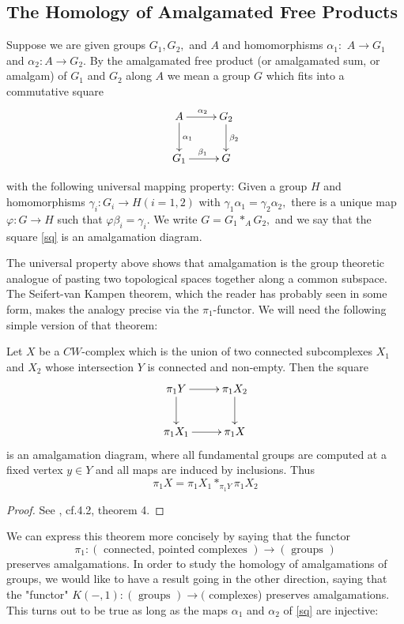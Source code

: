 \newpage
\subsection{The Homology of Amalgamated Free Products}
\begin{definition}
Suppose we are given groups $G_{1}, G_{2},$ and $A$ and homomorphisms $\alpha_{1}:$ $A \rightarrow G_{1}$ and $\alpha_{2}: A \rightarrow G_{2} .$ By the amalgamated free product (or amalgamated sum, or amalgam) of $G_{1}$ and $G_{2}$ along $A$ we mean a group $G$ which fits into a commutative square
\begin{equation}
\label{sq}
\xymatrix{
A \ar[d]^{\alpha_1} \ar[r]^{\alpha_2} &G_2 \ar[d]^{\beta_2}\\
G_1\ar[r]^{\beta_1} & G}
\end{equation}
\par
with the following universal mapping property: Given a group $H$ and homomorphisms $\gamma_{i}: G_{i} \rightarrow H(i=1,2)$ with $\gamma_{1} \alpha_{1}=\gamma_{2} \alpha_{2},$ there is a unique map
$\varphi: G \rightarrow H$ such that $\varphi \beta_{i}=\gamma_{i} .$ We write $G=G_{1} *_{A} G_{2},$ and we say that the square \eqref{sq} is an amalgamation diagram.
\end{definition}

The universal property above shows that amalgamation is the group theoretic analogue of pasting two topological spaces together along a common subspace. The Seifert-van Kampen theorem, which the reader has probably seen in some form, makes the analogy precise via the $\pi_{1}$-functor. We will need the following simple version of that theorem:
\begin{theorem}
\label{thm_van}
Let $X$ be a $C W$-complex which is the union of two connected subcomplexes $X_{1}$ and $X_{2}$ whose intersection $Y$ is connected and non-empty.
Then the square
$$
\xymatrix{
\pi_1 Y \ar[d] \ar[r] &\pi_1 X_2\ar[d]\\
\pi_1 X_1\ar[r] & \pi_1 X}
$$
is an amalgamation diagram, where all fundamental groups are computed at a fixed vertex $y \in Y$ and all maps are induced by inclusions. Thus
\[
\pi_{1} X=\pi_{1} X_{1} *_{\pi_{1}Y} \pi_{1} X_{2}
\]
\end{theorem}
\begin{proof}
See \cite{cohen1989combinatorial}, cf.4.2, theorem 4.
\end{proof}
We can express this theorem more concisely by saying that the functor
$$\pi_{1}:(\text { connected, pointed complexes }) \rightarrow(\text { groups })$$
preserves amalgamations. In order to study the homology of amalgamations of groups, we would like to have a result going in the other direction, saying that the "functor" $K(-, 1):(\text { groups }) \rightarrow($ complexes) preserves amalgamations. This turns out to be true as long as the maps $\alpha_{1}$ and $\alpha_{2}$ of \eqref{sq} are injective:

